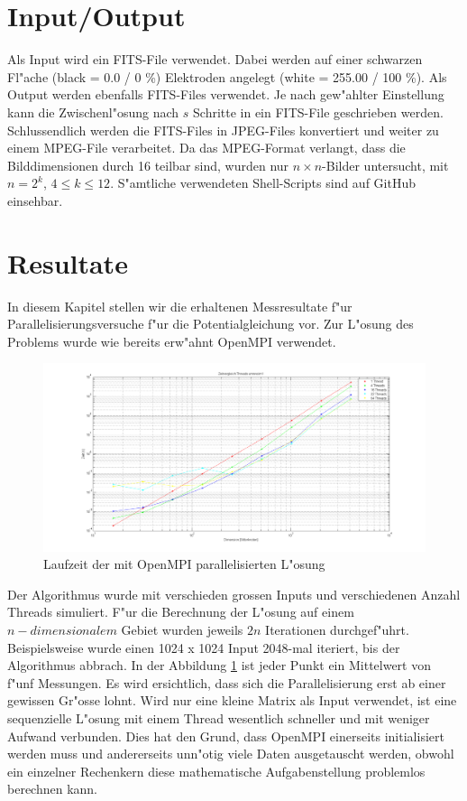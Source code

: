 \begin{refsection}
\section{Input/Output}
Als Input wird ein FITS-File verwendet. Dabei werden auf einer schwarzen
Fl"ache (black = 0.0 / 0 \%) Elektroden angelegt (white = 255.00 /
100 \%). Als Output werden ebenfalls FITS-Files verwendet. Je nach
gew"ahlter Einstellung kann die Zwischenl"osung nach $s$ Schritte in
ein FITS-File geschrieben werden. Schlussendlich werden die FITS-Files
in JPEG-Files konvertiert und weiter zu einem MPEG-File verarbeitet. Da
das MPEG-Format verlangt, dass die Bilddimensionen durch 16 teilbar sind,
wurden nur $n\times n$-Bilder untersucht, mit $n = 2^k$, $4\le k\le
12$. S"amtliche verwendeten Shell-Scripts sind auf GitHub einsehbar. 

\section{Resultate}

In diesem Kapitel stellen wir die erhaltenen Messresultate f"ur
Parallelisierungsversuche f"ur die Potentialgleichung vor. Zur L"osung
des Problems wurde wie bereits erw"ahnt OpenMPI verwendet. 
	
\begin{figure}
\centering 
\includegraphics[width=\hsize]{potential/images/Resultate/dimension}
\caption{Laufzeit der mit OpenMPI parallelisierten L"osung}
\label{dimension}
\end{figure}
		
Der Algorithmus wurde mit verschieden grossen Inputs und
verschiedenen Anzahl Threads simuliert. F"ur die Berechnung der L"osung
auf einem $n-dimensionalem$ Gebiet wurden jeweils $2n$ Iterationen
durchgef"uhrt. Beispielsweise wurde einen 1024 x 1024 Input 2048-mal
iteriert, bis der Algorithmus abbrach. In der Abbildung \ref{dimension}
ist jeder Punkt ein Mittelwert von f"unf Messungen. Es wird ersichtlich,
dass sich die Parallelisierung erst ab einer gewissen Gr"osse lohnt. Wird
nur eine kleine Matrix als Input verwendet, ist eine sequenzielle
L"osung mit einem Thread wesentlich schneller und mit weniger Aufwand
verbunden. Dies hat den Grund, dass OpenMPI einerseits initialisiert
werden muss und andererseits unn"otig viele Daten ausgetauscht werden,
obwohl ein einzelner Rechenkern diese mathematische Aufgabenstellung
problemlos berechnen kann. 
	

\end{refsection}
